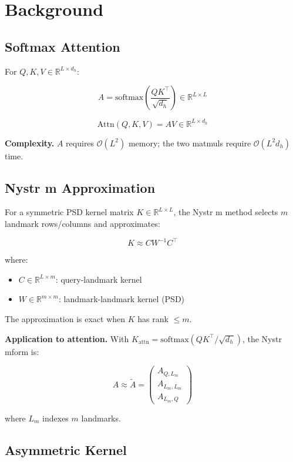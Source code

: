 
\section{Background}

\subsection{Softmax Attention}

For $Q, K, V \in \mathbb{R}^{L \times d_h}$:

\[
A = \text{softmax}\!\left(\frac{Q K^\top}{\sqrt{d_h}}\right) \in \mathbb{R}^{L \times L}
\]

\[
\text{Attn}(Q, K, V) = A V \in \mathbb{R}^{L \times d_h}
\]

\textbf{Complexity.} $A$ requires $\mathcal{O}(L^2)$ memory; the two matmuls 
require $\mathcal{O}(L^2 d_h)$ time.

\subsection{Nystr m Approximation}

For a symmetric PSD kernel matrix $K \in \mathbb{R}^{L \times L}$, the Nystr m 
method selects $m$ landmark rows/columns and approximates:

\[
K \approx C W^{-1} C^\top
\]

where:

\begin{itemize}
\item $C \in \mathbb{R}^{L \times m}$: query-landmark kernel
\item $W \in \mathbb{R}^{m \times m}$: landmark-landmark kernel (PSD)

\end{itemize}
The approximation is exact when $K$ has rank $\le m$.

\textbf{Application to attention.} With $K_\text{attn} = \text{softmax}(QK^\top / \sqrt{d_h})$, 
the Nystr mform is:

\[
A \approx \tilde{A} = \begin{pmatrix} A_{Q, L_m} \\ A_{L_m, L_m} \\ A_{L_m, Q} \end{pmatrix}
\]

where $L_m$ indexes $m$ landmarks.

\subsection{Asymmetric Kernel}


